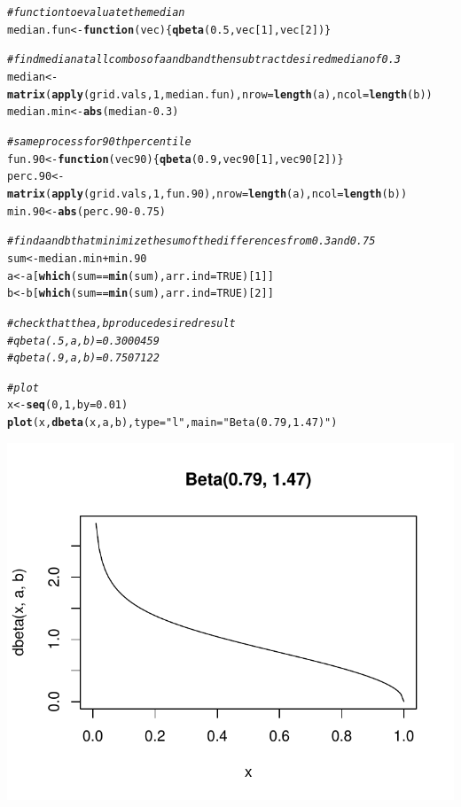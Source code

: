 \documentclass[12pt]{article}\usepackage[]{graphicx}\usepackage[]{color}
\makeatletter
\newcommand{\hlnum}[1]{\textcolor[rgb]{0.686,0.059,0.569}{#1}}%
\newcommand{\hlstr}[1]{\textcolor[rgb]{0.192,0.494,0.8}{#1}}%
\newcommand{\hlcom}[1]{\textcolor[rgb]{0.678,0.584,0.686}{\textit{#1}}}%
\newcommand{\hlopt}[1]{\textcolor[rgb]{0,0,0}{#1}}%
\newcommand{\hlstd}[1]{\textcolor[rgb]{0.345,0.345,0.345}{#1}}%
\newcommand{\hlkwa}[1]{\textcolor[rgb]{0.161,0.373,0.58}{\textbf{#1}}}%
\newcommand{\hlkwb}[1]{\textcolor[rgb]{0.69,0.353,0.396}{#1}}%
\newcommand{\hlkwc}[1]{\textcolor[rgb]{0.333,0.667,0.333}{#1}}%
\newcommand{\hlkwd}[1]{\textcolor[rgb]{0.737,0.353,0.396}{\textbf{#1}}}%
\newenvironment{kframe}{%
 \def\at@end@of@kframe{}%
 \ifinner\ifhmode%
  \def\at@end@of@kframe{\end{minipage}}%
  \begin{minipage}{\columnwidth}%
 \fi\fi%
 \def\FrameCommand##1{\hskip\@totalleftmargin \hskip-\fboxsep
 \colorbox{shadecolor}{##1}\hskip-\fboxsep
     \hskip-\linewidth \hskip-\@totalleftmargin \hskip\columnwidth}%
 \MakeFramed {\advance\hsize-\width
   \@totalleftmargin\z@ \linewidth\hsize
   \@setminipage}}%
 {\par\unskip\endMakeFramed%
 \at@end@of@kframe}
\newenvironment{knitrout}{}{} %
\makeatother
\begin{document}
\begin{doublespacing}
\begin{enumerate}
\begin{center}
\begin{singlespace}
\begin{knitrout}
\begin{kframe}
\begin{alltt}
\hlcom{#function to evaluate the median}
\hlstd{median.fun} \hlkwb{<-} \hlkwa{function}\hlstd{(}\hlkwc{vec}\hlstd{) \{}\hlkwd{qbeta}\hlstd{(}\hlnum{0.5}\hlstd{, vec[}\hlnum{1}\hlstd{], vec[}\hlnum{2}\hlstd{])\}}

\hlcom{#find median at all combos of a and b and then subtract desired median of 0.3}
\hlstd{median} \hlkwb{<-} \hlkwd{matrix}\hlstd{(}\hlkwd{apply}\hlstd{(grid.vals,}\hlnum{1}\hlstd{, median.fun),} \hlkwc{nrow}\hlstd{=}\hlkwd{length}\hlstd{(a),} \hlkwc{ncol}\hlstd{=}\hlkwd{length}\hlstd{(b))}
\hlstd{median.min} \hlkwb{<-} \hlkwd{abs}\hlstd{(median}\hlopt{-}\hlnum{0.3}\hlstd{)}

\hlcom{#same process for 90th percentile}
\hlstd{fun.90} \hlkwb{<-} \hlkwa{function}\hlstd{(}\hlkwc{vec90}\hlstd{) \{}\hlkwd{qbeta}\hlstd{(}\hlnum{0.9}\hlstd{, vec90[}\hlnum{1}\hlstd{], vec90[}\hlnum{2}\hlstd{])\}}
\hlstd{perc.90} \hlkwb{<-} \hlkwd{matrix}\hlstd{(}\hlkwd{apply}\hlstd{(grid.vals,}\hlnum{1}\hlstd{, fun.90),} \hlkwc{nrow}\hlstd{=}\hlkwd{length}\hlstd{(a),} \hlkwc{ncol}\hlstd{=}\hlkwd{length}\hlstd{(b))}
\hlstd{min.90} \hlkwb{<-} \hlkwd{abs}\hlstd{(perc.90}\hlopt{-}\hlnum{0.75}\hlstd{)}

\hlcom{#find a and b that minimize the sum of the differences from 0.3 and 0.75}
\hlstd{sum} \hlkwb{<-} \hlstd{median.min}\hlopt{+}\hlstd{min.90}
\hlstd{a} \hlkwb{<-} \hlstd{a[}\hlkwd{which}\hlstd{(sum} \hlopt{==} \hlkwd{min}\hlstd{(sum),} \hlkwc{arr.ind} \hlstd{=} \hlnum{TRUE}\hlstd{)[}\hlnum{1}\hlstd{]]}
\hlstd{b} \hlkwb{<-} \hlstd{b[}\hlkwd{which}\hlstd{(sum} \hlopt{==} \hlkwd{min}\hlstd{(sum),} \hlkwc{arr.ind} \hlstd{=} \hlnum{TRUE}\hlstd{)[}\hlnum{2}\hlstd{]]}

\hlcom{#check that the a,b produce desired result}
\hlcom{#qbeta(.5, a, b) = 0.3000459}
\hlcom{#qbeta(.9, a, b) = 0.7507122}

\hlcom{#plot}
\hlstd{x} \hlkwb{<-} \hlkwd{seq}\hlstd{(}\hlnum{0}\hlstd{,} \hlnum{1}\hlstd{,} \hlkwc{by}\hlstd{=}\hlnum{0.01}\hlstd{)}
\hlkwd{plot}\hlstd{(x,} \hlkwd{dbeta}\hlstd{(x, a, b),} \hlkwc{type}\hlstd{=}\hlstr{"l"}\hlstd{,} \hlkwc{main}\hlstd{=}\hlstr{"Beta(0.79, 1.47)"}\hlstd{)}
\end{alltt}
\end{kframe}
\includegraphics[width=0.5\linewidth]{figure/integrate-1} 


\end{knitrout}
\end{singlespace}
\end{center}
\end{enumerate}
\end{doublespacing}
\end{document}
